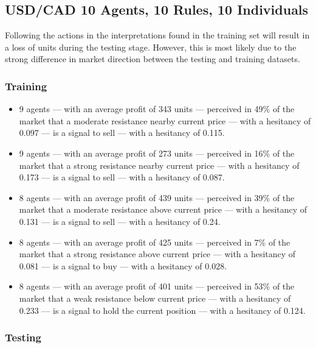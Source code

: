 \subsection{USD/CAD 10 Agents, 10 Rules, 10 Individuals}
\label{results:interpretation-usd-cad-10agents-10rules-10individuals}

Following the actions in the interpretations found in the training set will
result in a loss of units during the testing stage. However, this is most likely
due to the strong difference in market direction between the testing and
training datasets.

\subsubsection{Training}

{\small
  \begin{itemize}
  \item 9 agents — with an average profit of 343 units — perceived in 49\% of
    the market that a moderate resistance nearby current price — with a
    hesitancy of 0.097 — is a signal to sell — with a hesitancy of 0.115.
  \item 9 agents — with an average profit of 273 units — perceived in 16\% of
    the market that a strong resistance nearby current price — with a hesitancy
    of 0.173 — is a signal to sell — with a hesitancy of 0.087.
  \item 8 agents — with an average profit of 439 units — perceived in 39\% of
    the market that a moderate resistance above current price — with a hesitancy
    of 0.131 — is a signal to sell — with a hesitancy of 0.24.
  \item 8 agents — with an average profit of 425 units — perceived in 7\% of the
    market that a strong resistance above current price — with a hesitancy of
    0.081 — is a signal to buy — with a hesitancy of 0.028.
  \item 8 agents — with an average profit of 401 units — perceived in 53\% of
    the market that a weak resistance below current price — with a hesitancy of
    0.233 — is a signal to hold the current position — with a hesitancy of
    0.124.
  \end{itemize}
}

\subsubsection{Testing}

